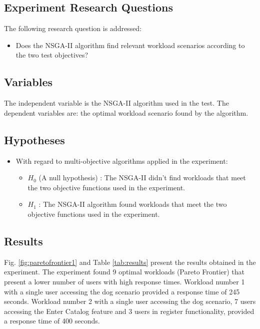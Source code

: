 \documentclass{report}
\begin{document}
\subsection{Experiment Research Questions}

The following research question is addressed:
\begin{itemize}
\item Does the NSGA-II algorithm find relevant workload scenarios according to the two test objectives?
\end{itemize}

\subsection{Variables}

The independent variable is the NSGA-II algorithm used in the test. The dependent variables are: the optimal workload scenario found by the algorithm.

\subsection{Hypotheses}

\begin{itemize}
\item With regard to multi-objective algorithms applied in the experiment:
\begin{itemize}
\item $H_{0}$ (A null hypothesis) : The NSGA-II didn't find workloads that meet the two objective functions used in the experiment.
\item $H_{1}$  : The NSGA-II  algorithm found workloads that meet the two objective functions used in the experiment.
\end{itemize}
\end{itemize}

\subsection{Results}

Fig. \ref{fig:paretofrontier1} and Table \ref{tab:results} present the results obtained in the experiment. The experiment found 9 optimal workloads (Pareto Frontier) that present a lower number of users with high response times. Workload number 1 with a single user accessing the dog scenario provided a response time of 245 seconds.  Workload number 2 with a single user accessing the dog scenario, 7 users accessing the Enter Catalog feature and 3 users in register functionality, provided a response time of 400 seconds.
\end{document}
